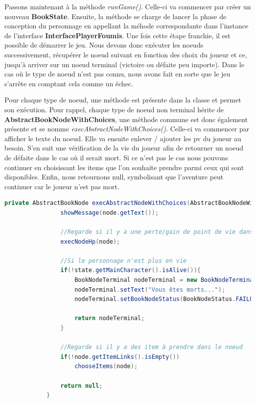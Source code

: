 			Passons maintenant à la méthode \textit{runGame()}. Celle-ci va commencer par créer un nouveau \textbf{BookState}. Ensuite, la méthode se charge de lancer la phase de conception du personnage en appellant la méhode correspondante dans l'instance de l'interface \textbf{InterfacePlayerFoumis}. Une fois cette étape franchie, il est possible de démarrer le jeu. Nous devons donc exécuter les noeuds successivement, récupérer le noeud suivant en fonction des choix du joueur et ce, jusqu'à arriver sur un noeud terminal (victoire ou défaite peu importe). Dans le cas où le type de noeud n'est pas connu, nous avons fait en sorte que le jeu s'arrête en comptant cela comme un échec.

			Pour chaque type de noeud, une méthode est présente dans la classe et permet son exécution.	Pour rappel, chaque type de noeud non terminal hérite de \textbf{AbstractBookNodeWithChoices}, une méthode commune est donc également présente et se nomme \textit{execAbstractNodeWithChoices()}. Celle-ci va commencer par afficher le texte du noeud. Elle va ensuite enlever / ajouter les pv du joueur au besoin. S'en suit une vérification de la vie du joueur afin de retourner un noeud de défaite dans le cas où il serait mort. Si ce n'est pas le cas nous pouvons continuer en choisissant les items que l'on souhaite prendre parmi ceux qui sont disponibles. Enfin, nous retournons null, symbolisant que l'aventure peut continuer car le joueur n'est pas mort.

			\begin{lstlisting}[gobble=12, language=java, caption=Méthode execAbstractNodeWithChoices(), label=lst:execAbstractNodeWithChoices]
			private AbstractBookNode execAbstractNodeWithChoices(AbstractBookNodeWithChoices node){
				showMessage(node.getText());

				//Regarde si il y a une perte/gain de point de vie dans le noeud
				execNodeHp(node);

				//Si le personnage n'est plus en vie
				if(!state.getMainCharacter().isAlive()){
					BookNodeTerminal nodeTerminal = new BookNodeTerminal();
					nodeTerminal.setText("Vous êtes morts...");
					nodeTerminal.setBookNodeStatus(BookNodeStatus.FAILURE);

					return nodeTerminal;
				}

				//Regarde si il y a des item à prendre dans le noeud
				if(!node.getItemLinks().isEmpty())
					chooseItems(node);

				return null;
			}
			\end{lstlisting}

